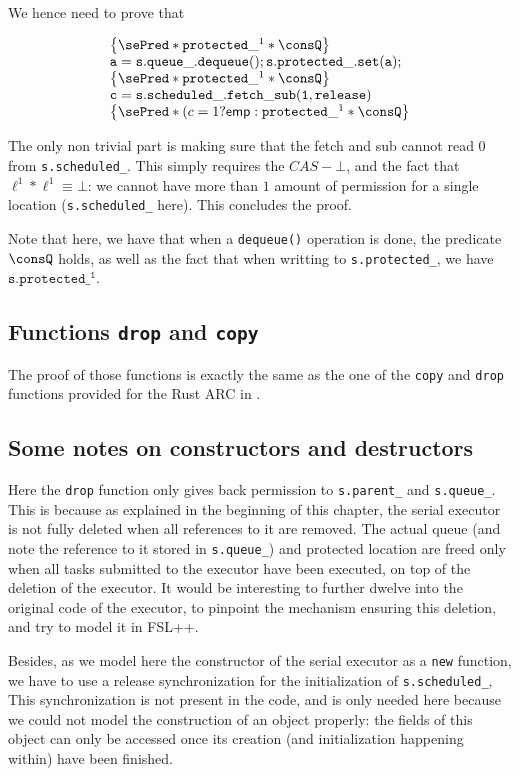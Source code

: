 We hence need to prove that 

\begin{equation*}
	\begin{array}{l}
		\left\{ \sePred * \mathtt{protected\_}^1 * \consQ \right\} \\
		\mathtt{a = s.queue\_.dequeue(); s.protected\_.set(a);} \\
		\left\{ \sePred * \mathtt{protected\_}^1 * \consQ \right\} \\
		\mathtt{c = s.scheduled\_.fetch\_sub(1, release)} \\
			\left\{ \sePred * (c = 1 ? \mathsf{emp} : \mathtt{protected\_}^1 * \consQ \right\}
	\end{array}
\end{equation*}

The only non trivial part is making sure that the fetch and sub cannot read 0 from \texttt{s.scheduled\_}. This simply requires the $CAS-\bot$, and the fact that $\ell^1 * \ell^1 \equiv \bot$: we cannot have more than $1$ amount of permission for a single location (\texttt{s.scheduled\_} here). This concludes the proof.

Note that here, we have that when a \texttt{dequeue()} operation is done, the predicate $\consQ$ holds, as well as the fact that when writting to \texttt{s.protected\_}, we have $\mathtt{s.protected\_^1}$.

\subsection{Functions \texttt{drop} and \texttt{copy}}
The proof of those functions is exactly the same as the one of the \texttt{copy} and \texttt{drop} functions provided for the Rust ARC in \cite{gaurav}.

\subsection{Some notes on constructors and destructors}
Here the \texttt{drop} function only gives back permission to \texttt{s.parent\_} and \texttt{s.queue\_}. This is because as explained in the beginning of this chapter, the serial executor is not fully deleted when all references to it are removed. The actual queue (and note the reference to it stored in \texttt{s.queue\_}) and protected location are freed only when all tasks submitted to the executor have been executed, on top of the deletion of the executor. It would be interesting to further dwelve into the original code of the executor, to pinpoint the mechanism ensuring this deletion, and try to model it in FSL++.

Besides, as we model here the constructor of the serial executor as a \texttt{new} function, we have to use a release synchronization for the initialization of \texttt{s.scheduled\_}, This synchronization is not present in the code, and is only needed here because we could not model the construction of an object properly: the fields of this object can only be accessed once its creation (and initialization happening within) have been finished.

